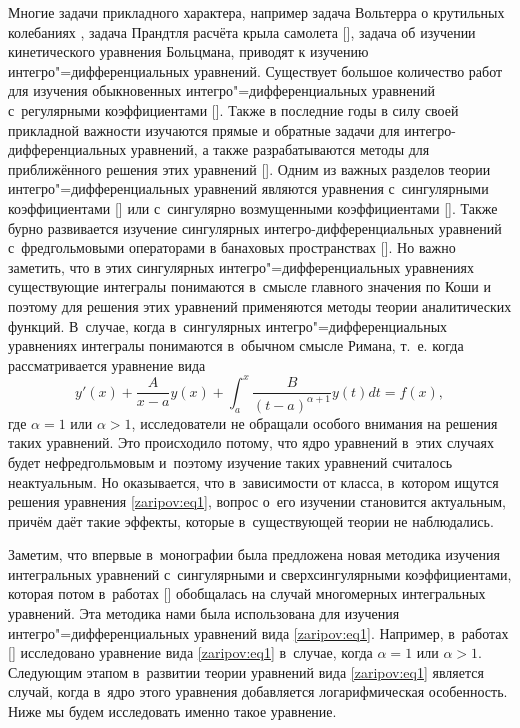 Многие задачи прикладного характера, например задача Вольтерра о крутильных колебаниях \cite{zar1:bib:Voltera}, задача Прандтля расчёта крыла самолета [], задача об изучении кинетического уравнения Больцмана, приводят к изучению интегро"=дифференциальных уравнений. 
 Существует большое количество работ для изучения обыкновенных интегро"=дифференциальных уравнений с~регулярными коэффициентами []. Также в последние годы в силу своей прикладной важности изучаются прямые и обратные задачи для интегро-дифференциальных уравнений, а также разрабатываются методы для приближённого решения этих уравнений []. 
 Одним из важных разделов теории интегро"=дифференциальных уравнений являются уравнения с~сингулярными коэффициентами [] или с~сингулярно возмущенными коэффициентами []. 
 Также бурно развивается изучение сингулярных интегро-дифференциальных уравнений с~фредгольмовыми операторами в банаховых пространствах []. 
 Но важно заметить, что в этих сингулярных интегро"=дифференциальных уравнениях существующие  интегралы понимаются в~смысле главного значения по Коши и поэтому для решения этих уравнений применяются методы теории аналитических функций. 
 В~случае, когда в~сингулярных интегро"=дифференциальных уравнениях интегралы понимаются в~обычном смысле Римана, т.~е. когда рассматривается уравнение вида
\begin{equation}
y'(x)+\frac{A}{x-a}y(x)+\int _{a}^{x}\frac{B}{(t-a)^{\alpha+1}}y(t)dt=f(x),
\label{zaripov:eq1}
\end{equation} 
где $\alpha=1$ или $\alpha>1$, исследователи не обращали особого внимания на решения таких уравнений. 
Это происходило потому, что ядро уравнений в~этих случаях будет нефредгольмовым и~поэтому изучение таких уравнений считалось неактуальным. 
Но оказывается, что в~зависимости от класса, в~котором ищутся решения уравнения \eqref{zaripov:eq1}, вопрос о~его изучении становится актуальным, причём даёт такие эффекты, которые в~существующей теории не наблюдались.

Заметим, что впервые в~монографии \cite{zar18:bib:Rajabov} была предложена новая методика изучения интегральных уравнений с~сингулярными и сверхсингулярными коэффициентами, которая потом в~работах [] обобщалась на случай многомерных интегральных уравнений. 
Эта методика нами была использована для изучения интегро"=дифференциальных уравнений вида \eqref{zaripov:eq1}. 
Например, в~работах [] исследовано уравнение вида \eqref{zaripov:eq1} в~случае, когда $\alpha=1$ или $\alpha>1$. 
Следующим этапом в~развитии теории уравнений вида  \eqref{zaripov:eq1} является случай, когда в~ядро этого уравнения добавляется логарифмическая особенность. 
Ниже мы будем исследовать именно такое  уравнение.

